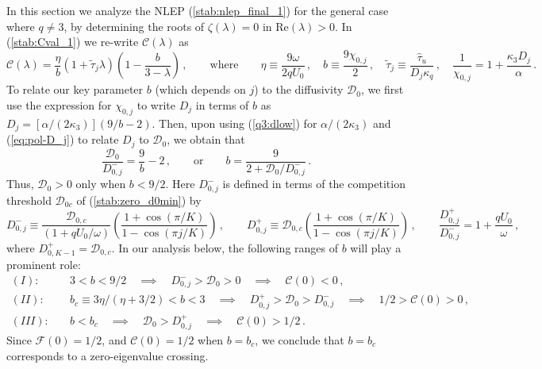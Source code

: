 \documentclass{article}%
\newcommand{\bsub}{\begin{subequations}}
\newcommand{\esub}{\end{subequations}$\!$}
\newcommand{\dzjp}{D^{+}_{0,j}}
\newcommand{\dzjm}{D^{-}_{0,j}}
\begin{document}
In this section we analyze the NLEP (\ref{stab:nlep_final_1}) for the
general case where $q\neq 3$, by determining the roots of
$\zeta(\lambda)=0$ in $\mbox{Re}(\lambda)>0$. In 
(\ref{stab:Cval_1}) we re-write ${\mathcal C}(\lambda)$ as
\begin{equation}\label{genq:C}
\mathcal{C}(\lambda)=\frac{\eta}{b}\left(1+\tilde{\tau}_{j}\lambda\right)
\left(1-\frac{b}{3-\lambda}\right)\,, \qquad\mbox{where} \qquad
\eta \equiv \frac{9\omega}{2qU_0}  \,, \quad 
b\equiv \frac{9\chi_{0,j}}{2}\,, \quad
\tilde{\tau}_{j} \equiv \frac{\hat{\tau}_{u}}{D_j \kappa_q} \,, \quad
 \frac{1}{\chi_{0,j}} = 1 + \frac{\kappa_3 D_j}{\alpha} \,.
\end{equation}
To relate our key parameter $b$ (which depends on $j$) to the
diffusivity ${\mathcal D}_0$, we first use the expression for
$\chi_{0,j}$ to write $D_j$ in terms of $b$ as
$D_{j}=\left[{\alpha/(2\kappa_3)}\right] \left({9/b}-2\right)$. Then,
upon using (\ref{q3:dlow}) for $\alpha/(2\kappa_3)$ and
(\ref{eq:pol-D_j}) to relate $D_j$ to ${\mathcal D}_0$, we obtain that
\begin{equation}\label{param:b}
      \frac{{\mathcal D}_0}{D^{-}_{0,j}}= \frac{9}{b}-2 \,, \qquad
  \mbox{or} \qquad   b = \frac{9}{2 + {\mathcal D}_0/D^{-}_{0,j}}  \,.
\end{equation}
Thus, ${\mathcal D}_0>0$ only when $b<{9/2}$.  Here $\dzjm$ is
defined in terms of the competition threshold ${\mathcal D}_{0c}$ of
(\ref{stab:zero_d0min}) by
\begin{equation}\label{param:dzjm}
   \dzjm \equiv \frac{{\mathcal D}_{0,c}}{\left(1+{q U_0/\omega}\right)}
  \left( \frac{1+\cos\left({\pi/K}\right)}
  {1-\cos\left({\pi j /K}\right)}\right) \,, \qquad
  \dzjp \equiv {\mathcal D}_{0,c} \left( \frac{1+\cos\left({\pi/K}\right)}
  {1-\cos\left({\pi j /K}\right)}\right) \,, \qquad
  \frac{\dzjp}{\dzjm}=1+ \frac{qU_0}{\omega} \,,
\end{equation}
where $D^{+}_{0,K-1}={\mathcal D}_{0,c}$.  In our analysis below, the
following ranges of $b$ will play a prominent role:
\bsub \label{genq:b_range}
\begin{align}
  (I):\quad  & 3<b<{9/2}  \quad \implies \quad \dzjm>{\mathcal D}_0>0 
   \quad \implies \quad {\mathcal C}(0)<0  \,, \\
  (II):\quad  & b_c\equiv {3\eta/\left(\eta + {3/2}\right)} < b< 3 \quad
    \implies \quad \dzjp >{\mathcal D}_0 >\dzjm \quad
    \implies \quad {1/2}>{\mathcal C}(0)>0 \,, \\
  (III):\quad  & b< b_c  \quad \implies \quad {\mathcal D}_0>\dzjp 
 \quad \implies \quad {\mathcal C}(0)>{1/2}\,.
\end{align}
\esub Since ${\mathcal F}(0)={1/2}$, and ${\mathcal C}(0)={1/2}$ when
$b=b_c$, we conclude that $b=b_c$ corresponds to a zero-eigenvalue
crossing.
\end{document}
